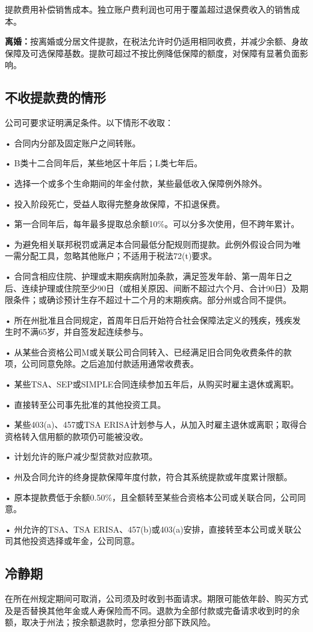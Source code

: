 \documentclass[UTF8,fontset=none,11pt,a4paper]{ctexart}
\begin{document}
提款费用补偿销售成本。独立账户费利润也可用于覆盖超过退保费收入的销售成本。


\textbf{离婚：}按离婚或分居文件提款，在税法允许时仍适用相同收费，并减少余额、身故保障及可选保障基数。提款可超过不按比例降低保障的额度，对保障有显著负面影响。


\subsection*{不收提款费的情形}
公司可要求证明满足条件。以下情形不收取：


• 合同内分部及固定账户之间转账。


• B类十二合同年后，某些地区十年后；L类七年后。


• 选择一个或多个生命期间的年金付款，某些最低收入保障例外除外。


• 投入阶段死亡，受益人取得完整身故保障，不扣退保费。


• 第一合同年后，每年最多提取总余额10\%。可以分多次使用，但不跨年累计。


• 为避免相关联邦税罚或满足本合同最低分配规则而提款。此例外假设合同为唯一需分配工具，忽略其他账户；不适用于税法72(t)要求。


• 合同含相应住院、护理或末期疾病附加条款，满足签发年龄、第一周年日之后、连续护理或住院至少90日（或相关原因、间断不超过六个月、合计90日）及期限条件；或确诊预计生存不超过十二个月的末期疾病。部分州或合同不提供。


• 所在州批准且合同规定，首周年日后开始符合社会保障法定义的残疾，残疾发生时不满65岁，并自签发起连续参与。


• 从某些合资格公司M或关联公司合同转入、已经满足旧合同免收费条件的款项，公司同意免除。之后追加付款适用通常收费表。


• 某些TSA、SEP或SIMPLE合同连续参加五年后，从购买时雇主退休或离职。


• 直接转至公司事先批准的其他投资工具。


• 某些403(a)、457或TSA ERISA计划参与人，从加入时雇主退休或离职；取得合资格转入信用额的款项仍可能被没收。


• 计划允许的账户减少型贷款对应款项。


• 州及合同允许的终身提款保障年度付款，符合其系统提款或年度累计限额。


• 原本提款费低于余额0.50\%，且全额转至某些合资格本公司或关联合同，公司同意。


• 州允许的TSA、TSA ERISA、457(b)或403(a)安排，直接转至本公司或关联公司其他投资选择或年金，公司同意。


\subsection*{冷静期}
在所在州规定期间可取消，公司须及时收到书面请求。期限可能依年龄、购买方式及是否替换其他年金或人寿保险而不同。退款为全部付款或完备请求收到时的余额，取决于州法；按余额退款时，您承担分部下跌风险。
\end{document}
